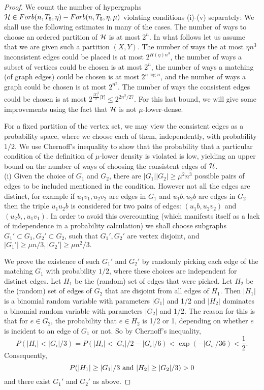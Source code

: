 \documentclass[11pt]{article}
\begin{document}
\begin{proof}
We count the number of hypergraphs $\mathcal{H}\in
Forb(n,T_5,\eta)-Forb(n,T_5,\eta,\mu)$ violating conditions (i)-(v)
 separately: We shall use the following estimates in many of the
 cases.
The number of ways to choose an ordered partition of $\mathcal{H}$ is at
most $2^n$. In what follows let us assume that we are given such a
partition $(X, Y)$.  The number of ways the at most $\eta n^3$ inconsistent
edges could be placed is at most $2^{H(\eta)n^3}$, the number of
ways a subset of vertices could be chosen is at most $2^n$, the
number of ways a matching (of graph edges) could be chosen is at most $2^{n\log n}$,
and the number of ways a graph could be chosen is at most $2^{n^2}.$  The number of ways the consistent
edges could be chosen is at most $2^{\frac{|X|^2}{2}|Y|}\le 2^{2n^3/27}$. For this last bound, we will give some improvements using the fact that $\mathcal{H}$ is not  $\mu$-lower-dense.

 For a fixed partition  of the vertex set,
 we may view the consistent edges as a probability space, where we choose each of them, independently, with probability $1/2$.
We use  Chernoff's inequality to show that the probability that a
particular condition of the definition of  $\mu$-lower density is
violated is low, yielding an upper bound on the number of ways of
choosing
the consistent edges of $\mathcal{H}$.\\

(i) Given  the choice of $G_1$ and $G_2$,
 there are  $|G_1||G_2| \ge \mu^2 n^3$
possible pairs of  edges to be included mentioned in the
condition. However not all the edges are distinct, for example
if $u_1v_1, u_2v_2$ are edges in $G_1$ and $u_1b,u_2b$ are edges in $G_2$ then
the triple $u_1u_2b$ is considered for two pairs of edges:
$(u_1b,u_2v_2)$ and $(u_2b, , u_1v_1)$. In order to avoid this overcounting (which manifests itself as a lack of independence in a probability calculation) we shall choose subgraphs $G_1'\subset G_1,
G_2'\subset G_2$, such that $G_1',G_2'$ are vertex disjoint, and
$|G_1'|\ge \mu n/3, |G_2'|\ge \mu n^2/3.$

 We prove the existence of such $G_1'$ and $G_2'$ by randomly picking each edge of the matching $G_1$ with probability $1/2$,
  where these choices are independent for distinct edges.  Let $H_1$ be the (random) set of edges that were picked.
  Let $H_2$ be the (random) set of edges of $G_2$ that are disjoint from all edges of $H_1$.
   Then  $|H_1|$ is a binomial random variable with parameters $|G_1|$ and 1/2 and $|H_2|$ dominates a binomial
    random variable with parameters $|G_2|$ and 1/2.  The reason for this is that for $e \in G_2$, the probability that
    $e \in H_2$ is 1/2 or 1, depending on whether $e$ is incident to an edge of $G_1$ or not.
  So by Chernoff's inequality,
$$P(|H_i| < |G_i|/3)=P(|H_i| < |G_i|/2 -|G_i|/6)<\exp(-|G_i|/36)<\frac{1}{2}.$$
Consequently, $$P(|H_1| \ge |G_1|/3 \hbox{ and } |H_2| \ge |G_2|/3)>0$$
 and there exist $G_1'$ and $G_2'$ as above.


\end{proof}
\end{document}

